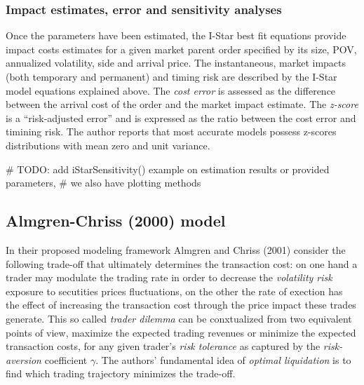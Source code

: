 \hypertarget{impact-estimates-error-and-sensitivity-analyses}{%
\subsubsection{Impact estimates, error and sensitivity
analyses}\label{impact-estimates-error-and-sensitivity-analyses}}

Once the parameters have been estimated, the I-Star best fit equations
provide impact costs estimates for a given market parent order specified
by its size, POV, annualized volatility, side and arrival price. The
instantaneous, market impacts (both temporary and permanent) and timing
risk are described by the I-Star model equations explained above. The
\emph{cost error} is assessed as the difference between the arrival cost
of the order and the market impact estimate. The \emph{z-score} is a
``risk-adjusted error'' and is expressed as the ratio between the cost
error and timining risk. The author reports that most accurate models
possess z-scores distributions with mean zero and unit variance.

\begin{Schunk}
\begin{Sinput}
# TODO: add iStarSensitivity() example on estimation results or provided parameters,
#  we also have plotting methods
\end{Sinput}
\end{Schunk}

\hypertarget{almgren-chriss-2000-model}{%
\subsection{Almgren-Chriss (2000)
model}\label{almgren-chriss-2000-model}}

In their proposed modeling framework Almgren and Chriss (2001) consider
the following trade-off that ultimately determines the transaction cost:
on one hand a trader may modulate the trading rate in order to decrease
the \emph{volatility risk} exposure to secutities prices fluctuations,
on the other the rate of exection has the effect of increasing the
transaction cost through the price impact these trades generate. This so
called \emph{trader dilemma} can be conxtualized from two equivalent
points of view, maximize the expected trading revenues or minimize the
expected transaction costs, for any given trader's \emph{risk tolerance}
as captured by the \emph{risk-aversion} coefficient \(\gamma\). The
authors' fundamental idea of \emph{optimal liquidation} is to find which
trading trajectory minimizes the trade-off.

